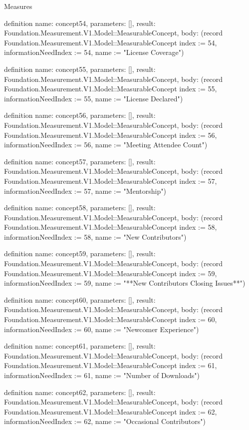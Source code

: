 \begin{lexlean}{Measures}
\begin{semanticmodule}
definition{
  name: concept54,
  parameters: [],
  result: Foundation.Measurement.V1.Model::MeasurableConcept,
  body: (record Foundation.Measurement.V1.Model::MeasurableConcept {index := 54, informationNeedIndex := 54, name := "License Coverage"})
}

definition{
  name: concept55,
  parameters: [],
  result: Foundation.Measurement.V1.Model::MeasurableConcept,
  body: (record Foundation.Measurement.V1.Model::MeasurableConcept {index := 55, informationNeedIndex := 55, name := "License Declared"})
}

definition{
  name: concept56,
  parameters: [],
  result: Foundation.Measurement.V1.Model::MeasurableConcept,
  body: (record Foundation.Measurement.V1.Model::MeasurableConcept {index := 56, informationNeedIndex := 56, name := "Meeting Attendee Count"})
}

definition{
  name: concept57,
  parameters: [],
  result: Foundation.Measurement.V1.Model::MeasurableConcept,
  body: (record Foundation.Measurement.V1.Model::MeasurableConcept {index := 57, informationNeedIndex := 57, name := "Mentorship"})
}

definition{
  name: concept58,
  parameters: [],
  result: Foundation.Measurement.V1.Model::MeasurableConcept,
  body: (record Foundation.Measurement.V1.Model::MeasurableConcept {index := 58, informationNeedIndex := 58, name := "New Contributors"})
}

definition{
  name: concept59,
  parameters: [],
  result: Foundation.Measurement.V1.Model::MeasurableConcept,
  body: (record Foundation.Measurement.V1.Model::MeasurableConcept {index := 59, informationNeedIndex := 59, name := "**New Contributors Closing Issues**"})
}

definition{
  name: concept60,
  parameters: [],
  result: Foundation.Measurement.V1.Model::MeasurableConcept,
  body: (record Foundation.Measurement.V1.Model::MeasurableConcept {index := 60, informationNeedIndex := 60, name := "Newcomer Experience"})
}

definition{
  name: concept61,
  parameters: [],
  result: Foundation.Measurement.V1.Model::MeasurableConcept,
  body: (record Foundation.Measurement.V1.Model::MeasurableConcept {index := 61, informationNeedIndex := 61, name := "Number of Downloads"})
}

definition{
  name: concept62,
  parameters: [],
  result: Foundation.Measurement.V1.Model::MeasurableConcept,
  body: (record Foundation.Measurement.V1.Model::MeasurableConcept {index := 62, informationNeedIndex := 62, name := "Occasional Contributors"})
}


\end{semanticmodule}
\end{lexlean}
